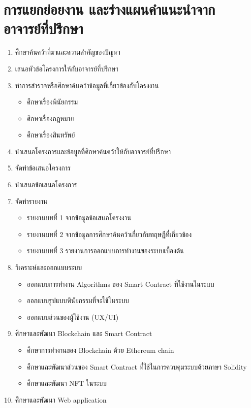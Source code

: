 \documentclass[12pt,oneside,openright,a4paper]{cpe-thai-project}
\begin{document}
\section{การแยกย่อยงาน และร่างแผนคำแนะนำจากอาจารย์ที่ปรึกษา}
\begin{enumerate}
\item ศึกษาค้นคว้าที่มาและความสำคัญของปัญหา
\item เสนอหัวข้อโครงการให้กับอาจารย์ที่ปรึกษา
\item ทำการสำรวจหรือศึกษาค้นคว้าข้อมูลที่เกี่ยวข้องกับโครงงาน
	\begin{itemize}
		\item ศึกษาเรื่องพินัยกรรม
		\item ศึกษาเรื่องกฎหมาย
		\item ศึกษาเรื่องสินทรัพย์
	\end{itemize}
\item นำเสนอโครงการและข้อมูลทึ่ศึกษาค้นคว้าให้กับอาจารย์ที่ปรึกษา
\item จัดทำข้อเสนอโครงการ
\item นำเสนอข้อเสนอโครงการ
\item จัดทำรายงาน
	\begin{itemize}
		\item รายงานบทที่ 1 จากข้อมูลข้อเสนอโครงงาน
		\item รายงานบทที่ 2 จากข้อมูลการศึกษาค้นคว้าเกี่ยวกับทฤษฎีที่เกี่ยวข้อง
		\item รายงานบทที่ 3 รายงานการออกแบบการทำงานของระบบเบื้องต้น
	\end{itemize}
\item วิเคราะห์และออกแบบระบบ
	\begin{itemize}
		\item ออกแบบการทำงาน Algorithms ของ Smart Contract ที่ใช้งานในระบบ
		\item ออกแบบรูปแบบพินัยกรรมที่จะใช้ในระบบ
		\item ออกแบบส่วนของผู้ใช้งาน (UX/UI)
	\end{itemize}
\item ศึกษาและพัฒนา Blockchain และ Smart Contract
	\begin{itemize}
		\item ศึกษาการทำงานของ Blockchain ด้วย Ethereum chain
		\item ศึกษาและพัฒนาส่วนของ Smart Contract ที่ใช้ในการควบคุมระบบด้วยภาษา Solidity
		\item ศึกษาและพัฒนา NFT ในระบบ
	\end{itemize}
\item ศึกษาและพัฒนา Web application

\end{enumerate}
\end{document}
